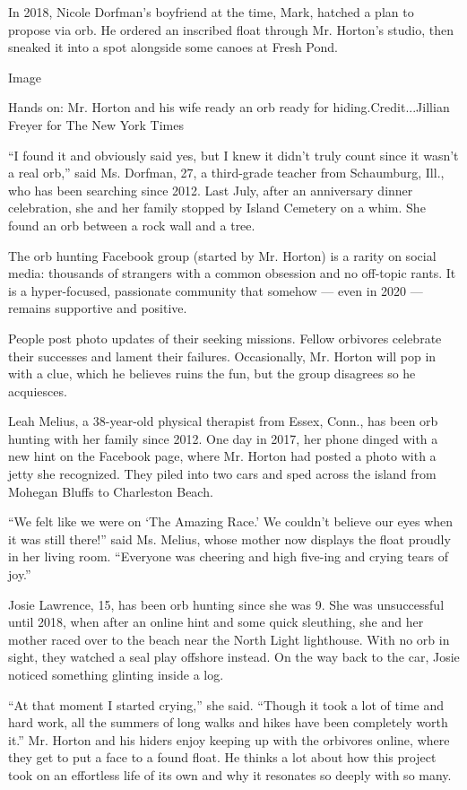 In 2018, Nicole Dorfman's boyfriend at the time, Mark, hatched a plan to
propose via orb. He ordered an inscribed float through Mr. Horton's
studio, then sneaked it into a spot alongside some canoes at Fresh Pond.

Image

Hands on: Mr. Horton and his wife ready an orb ready for
hiding.Credit...Jillian Freyer for The New York Times

``I found it and obviously said yes, but I knew it didn't truly count
since it wasn't a real orb,'' said Ms. Dorfman, 27, a third-grade
teacher from Schaumburg, Ill., who has been searching since 2012. Last
July, after an anniversary dinner celebration, she and her family
stopped by Island Cemetery on a whim. She found an orb between a rock
wall and a tree.

The orb hunting Facebook group (started by Mr. Horton) is a rarity on
social media: thousands of strangers with a common obsession and no
off-topic rants. It is a hyper-focused, passionate community that
somehow --- even in 2020 --- remains supportive and positive.

People post photo updates of their seeking missions. Fellow orbivores
celebrate their successes and lament their failures. Occasionally, Mr.
Horton will pop in with a clue, which he believes ruins the fun, but the
group disagrees so he acquiesces.

Leah Melius, a 38-year-old physical therapist from Essex, Conn., has
been orb hunting with her family since 2012. One day in 2017, her phone
dinged with a new hint on the Facebook page, where Mr. Horton had posted
a photo with a jetty she recognized. They piled into two cars and sped
across the island from Mohegan Bluffs to Charleston Beach.

``We felt like we were on `The Amazing Race.' We couldn't believe our
eyes when it was still there!'' said Ms. Melius, whose mother now
displays the float proudly in her living room. ``Everyone was cheering
and high five-ing and crying tears of joy.''

Josie Lawrence, 15, has been orb hunting since she was 9. She was
unsuccessful until 2018, when after an online hint and some quick
sleuthing, she and her mother raced over to the beach near the North
Light lighthouse. With no orb in sight, they watched a seal play
offshore instead. On the way back to the car, Josie noticed something
glinting inside a log.

``At that moment I started crying,'' she said. ``Though it took a lot of
time and hard work, all the summers of long walks and hikes have been
completely worth it.'' Mr. Horton and his hiders enjoy keeping up with
the orbivores online, where they get to put a face to a found float. He
thinks a lot about how this project took on an effortless life of its
own and why it resonates so deeply with so many.

